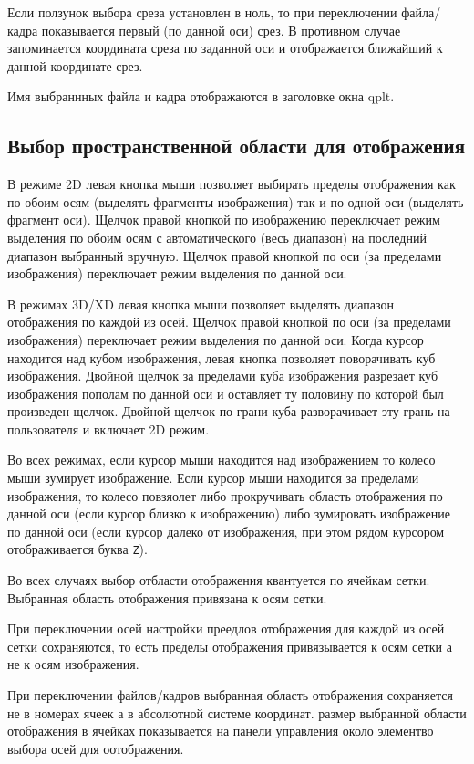 \documentclass[12pt]{article}
\begin{document}
Если ползунок выбора среза установлен в ноль, то при переключении файла/кадра показывается первый (по данной оси) срез.
В противном случае запоминается координата среза по заданной оси и отображается ближайший к данной координате срез.

Имя выбраннных файла и кадра отображаются в заголовке окна qplt.

\subsection{Выбор пространственной области для отображения}
В режиме 2D левая кнопка мыши позволяет выбирать пределы отображения как по обоим осям (выделять фрагменты изображения)
так и по одной оси (выделять фрагмент оси). Щелчок правой кнопкой по изображению переключает режим выделения
по обоим осям с автоматического (весь диапазон) на последний диапазон выбранный вручную. 
Щелчок правой кнопкой по оси (за пределами изображения) переключает режим выделения по данной оси.

В режимах 3D/XD левая кнопка мыши позволяет выделять диапазон отображения по каждой из осей. 
Щелчок правой кнопкой по оси (за пределами изображения) переключает режим выделения по данной оси.
Когда курсор  находится над кубом изображения, левая кнопка позволяет поворачивать куб изображения.
Двойной щелчок за пределами куба изображения разрезает куб изображения пополам по данной оси и оставляет ту половину
по которой был произведен щелчок. Двойной щелчок по грани куба разворачивает эту грань на пользователя и включает 2D режим.

Во всех режимах, если курсор мыши находится над изображением то колесо мыши зумирует изображение.
Если курсор мыши находится за пределами изображения, то колесо повзяолет либо прокручивать область отображения по данной оси (если курсор
близко к изображению) либо зумировать изображение по данной оси (если курсор далеко от изображения, при этом рядом  курсором отображивается буква \verb'Z').

Во всех случаях выбор отбласти отображения квантуется по ячейкам сетки. 
Выбранная область отображения привязана к осям сетки.

При переключении осей настройки преедлов отображения для каждой из осей сетки сохраняются, то есть пределы отображения привязывается к осям сетки а не к осям изображения.

При переключении файлов/кадров выбранная область отображения сохраняется не в номерах ячеек а в абсолютной системе координат.
размер выбранной области отображения в ячейках показывается на панели управления около элементво выбора осей для оотображения.
\end{document}
